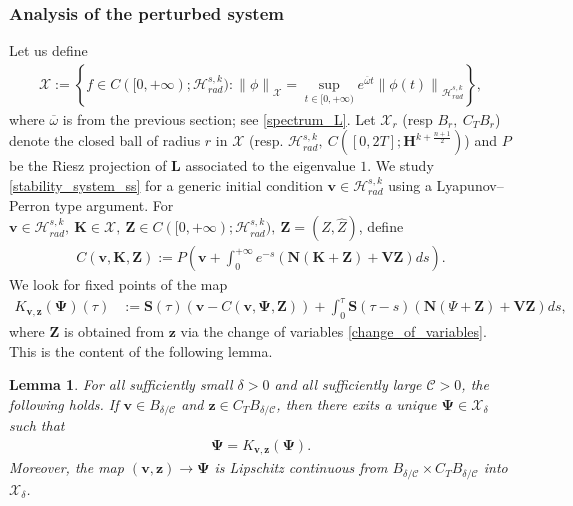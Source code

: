 \documentclass[12pt,reqno]{amsart}
\theoremstyle{plain}
\theoremstyle{remark}
\theoremstyle{plain}
\newtheorem{lemma}[theorem]{Lemma}
\theoremstyle{definition}
\numberwithin{equation}{section}
\numberwithin{equation}{section}
\newcommand{\norm}[1]{\left\|#1\right\|}
\newcommand{\HH}{\mathcal{H}}
\begin{document}
	\subsubsection{Analysis of the perturbed system}
	Let us define 
	\begin{align*}
		\mathcal{X}:=\left\{f\in C([0,+\infty);\HH_{rad}^{s,k}):\norm{\phi}_{\mathcal{X}}=\sup_{t\in [0,+\infty)}e^{\overline{\omega} t}\norm{\phi(t)}_{\HH_{rad}^{s,k}}\right\},
	\end{align*}
    where $\overline{\omega}$ is from the previous section; see \eqref{spectrum_L}.
    Let $\mathcal{X}_{r}$ (resp $B_{r},\ C_{T}B_{r}$) denote the closed ball of radius $r$ in $\mathcal{X}$ (resp. $\HH_{rad}^{s,k},\ C([0,2T];\mathbf{H}^{k+\frac{n+1}{2}})$) and $P$ be the Riesz projection of $\mathbf{L}$ associated to the eigenvalue $1$.
	We study \eqref{stability_system_ss} for a generic initial condition $\mathbf{v}\in \HH_{rad}^{s,k}$ using a Lyapunov–Perron type argument.
	For $\mathbf{v}\in \HH_{rad}^{s,k},\ \mathbf{K}\in \mathcal{X},\ \mathbf{Z}\in C([0,+\infty);\HH_{rad}^{s,k}),\ \mathbf{Z}=(Z,\hat{Z})$, define
	\begin{align*}
		C(\mathbf{v},\mathbf{K},\mathbf{Z}):=P\left(\mathbf{v}+\int_0^{+\infty} e^{-s}\left(\mathbf{N}(\mathbf{K}+\mathbf{Z})+\mathbf{V}\mathbf{Z}\right) ds\right).
	\end{align*}
	We look for fixed points of the map 
	\begin{align*}
		K_{\mathbf{v},\mathbf{z}}(\mathbf{\Psi})(\tau)&:=\mathbf{S}(\tau)(\mathbf{v}- C(\mathbf{v},\mathbf{\Psi},\mathbf{Z}))+\int_0^\tau \mathbf{S}(\tau-s)\left(\mathbf{N}(\Psi+\mathbf{Z})+\mathbf{V}\mathbf{Z}\right) ds,
	\end{align*}
	where $\mathbf{Z}$ is obtained from $\mathbf{z}$ via the change of variables \eqref{change_of_variables}.
	This is the content of the following lemma.
	\begin{lemma}\label{well-posed_system_stabilized}
		For all sufficiently small $\delta>0$ and all sufficiently large $\mathcal{C}>0$, the
		following holds. If $\mathbf{v}\in B_{{\delta}/{\mathcal{C}}}$ and $\mathbf{z}\in C_{T}B_{\delta/\mathcal{C}}$, then there exits a unique $\mathbf{\Psi}  \in \mathcal{X}_{\delta}$ such that
        \begin{align*}
            \mathbf{\Psi}=K_{\mathbf{v},\mathbf{z}}(\mathbf{\Psi}).
        \end{align*}
		Moreover, the map $(\mathbf{v},\mathbf{z})\rightarrow \mathbf{\Psi}$ is Lipschitz continuous from $B_{\delta/\mathcal{C}}\times C_{T}B_{\delta/\mathcal{C}}$ into $\mathcal{X}_{\delta}$.
	\end{lemma}
\end{document}
